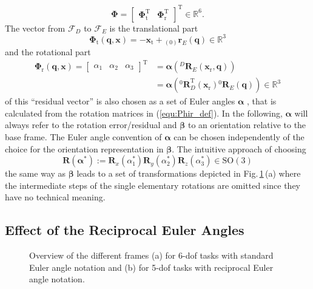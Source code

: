 \documentclass{svproc}
\newcommand{\bm}[1]{\boldsymbol{#1}}
\newcommand{\ortvek}[4]{{ }_{(#1)}{\boldsymbol{#2}}^{#3}_{#4} }
\newcommand{\rotmat}[2]{{{ }^{#1}\boldsymbol{R}}_{#2}}
\newcommand{\transp}[0]{{\mathrm{T}}}
\newcommand{\ks}[1]{{\mathcal{F}}_{#1}}
\begin{document}
%
\begin{equation}
\bm{\Phi}=\begin{bmatrix}
\bm{\Phi}_{\mathrm{t}}^\transp & \bm{\Phi}_{\mathrm{r}}^\transp
\end{bmatrix}^\transp \in {\mathbb{R}}^{6}.
\label{equ:Phi_def}
\end{equation}
%
The vector from $\ks{D}$ to $\ks{E}$ is the translational part 
%
\begin{equation}
\bm{\Phi}_{\mathrm{t}}(\bm{q},\bm{x}) = - \bm{x}_{\mathrm{t}} + \ortvek{0}{r}{}{E}(\bm{q}) \in {\mathbb{R}}^{3}
\label{equ:Phit_def}
\end{equation}
%
and the rotational part
%
\begin{align}
\bm{\Phi}_{\mathrm{r}}(\bm{q},\bm{x}) 
= \begin{bmatrix}
\alpha_1  & \alpha_2 & \alpha_3
\end{bmatrix}^\transp
&=\bm{\alpha}\left(\rotmat{D}{E}(\bm{x}_{\mathrm{r}},\bm{q})\right)\nonumber \\
&=\bm{\alpha}\left(\rotmat{0}{D}^\transp (\bm{x}_{\mathrm{r}})\rotmat{0}{E}(\bm{q})\right) \in {\mathbb{R}}^{3}
\label{equ:Phir_def}
\end{align}
%
of this ``residual vector'' is also chosen as a set of Euler angles $\bm{\alpha}$ \cite{GoldenbergBenFen1985}, that is calculated from the rotation matrices in (\ref{equ:Phir_def}).
In the following, $\bm{\alpha}$ will always refer to the rotation error/residual and $\bm{\beta}$ to an orientation relative to the base frame.
The Euler angle convention of $\bm{\alpha}$ can be chosen independently of the choice for the orientation representation in  $\bm{\beta}$.
The intuitive approach of choosing
%
\begin{equation}
\bm{R}(\bm{\alpha}^*) := \bm{R}_x(\alpha_1^*) \bm{R}_y(\alpha_2^*) \bm{R}_z(\alpha_3^*) \in \mathrm{SO(3)}
\label{equ:alpha_convention_xyz}
\end{equation}
%
the same way as $\bm{\beta}$ leads to a set of transformations depicted in Fig.\,\ref{fig:frames_5dof_6dof}\,(a) where the intermediate steps of the single elementary rotations are omitted since they have no technical meaning.
%

\subsection{Effect of the Reciprocal Euler Angles}
\label{sec:RecEulAng_effect}


\begin{figure}[htb]
    
    \caption{Overview of the different frames (a) for 6-dof tasks with standard Euler angle notation and (b) for 5-dof tasks with reciprocal Euler angle notation.}
    \label{fig:frames_5dof_6dof}
\end{figure} 
\end{document}
